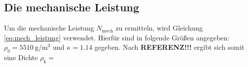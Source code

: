 \subsection[]{Die mechanische Leistung}
Um die mechanische Leistung $N_\text{mech}$ zu ermitteln, wird Gleichung \eqref{eq:mech_leistung} verwendet.
Hierfür sind in \cite[]{man:v206} folgende Größen angegeben: $\rho_\text{0} = \qty[]{5510}{\gram\per\cubic\meter}$ 
und $\kappa = \num[]{1.14}$ gegeben.
Nach \textbf{REFERENZ!!!} ergibt sich somit eine Dichte $\rho_\text{k} = \qty[]{}{}$